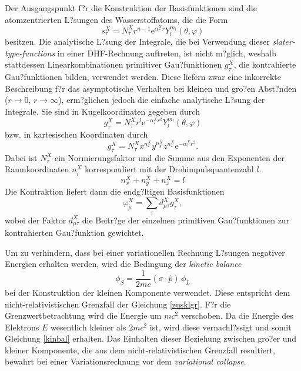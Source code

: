Der Ausgangspunkt f?r die Konstruktion der Basisfunktionen sind die atomzentrierten L?sungen des Wasserstoffatoms, die die Form
\begin{equation}
s_\tau^X = N_\tau^X r^{n-1}\mathrm{e}^{\alpha_\tau^X r}Y_l^{m_l}(\theta,\varphi)
\end{equation}
besitzen. Die analytische L?sung der Integrale, die bei Verwendung dieser \emph{slater-type-functions} in einer DHF-Rechnung auftreten, ist nicht m?glich, weshalb stattdessen Linearkombinationen primitiver Gau?funktionen $g_\tau^X$, die kontrahierte Gau?funktionen bilden, verwendet werden. Diese liefern zwar eine inkorrekte Beschreibung f?r das asymptotische Verhalten bei kleinen und gro?en Abst?nden ($r\rightarrow 0$, $r\rightarrow\infty$), erm?glichen jedoch die einfache analytische L?sung der Integrale. Sie sind in Kugelkoordinaten gegeben durch
\begin{equation}
g_\tau^X = N_\tau^Xr^l\mathrm{e}^{-\alpha_\tau^Xr^2}Y_l^{m_l}(\theta,\varphi)
\end{equation}
bzw. in kartesischen Koordinaten durch
\begin{equation}
g_\tau^X = N_\tau^X x^{n_x^X}y^{n_y^X}z^{n_z^X} \mathrm{e}^{-\alpha_\tau^Xr^2}.
\end{equation}
Dabei ist $N_\tau^X$ ein Normierungsfaktor und die Summe aus den Exponenten der Raumkoordinaten $n_i^X$ korrespondiert mit der Drehimpulsquantenzahl $l$.
\begin{equation}
n_x^X+n_y^X+n_z^X=l
\end{equation}
Die Kontraktion liefert dann die endg?ltigen Basisfunktionen
\begin{equation}
\varphi^X_\mu = \sum\limits_\tau d_{\mu\tau}^Xg_\tau^X,
\end{equation}
wobei der Faktor $d_{\mu\tau}^X$ die Beitr?ge der einzelnen primitiven Gau?funktionen zur kontrahierten Gau?funktion gewichtet.

Um zu verhindern, dass bei einer variationellen Rechnung L?sungen negativer Energien erhalten werden, wird die Bedingung der \emph{kinetic balance}
\begin{equation}\label{kinbal}
\phi_S = \frac1{2mc}(\sigma\cdot\hat{p})\,\phi_L
\end{equation}
 bei der Konstruktion der kleinen Komponente verwendet. Diese entspricht dem nicht-relativistischen Grenzfall der Gleichung \ref{zusklgr}. F?r die Grenzwertbetrachtung wird die Energie um $mc^2$ verschoben. Da die Energie des Elektrons $E$ wesentlich kleiner als $2mc^2$ ist, wird diese vernachl?ssigt und somit Gleichung \ref{kinbal} erhalten.
Das Einhalten dieser Beziehung zwischen gro?er und kleiner Komponente, die aus dem nicht-relativistischen Grenzfall resultiert, bewahrt bei einer Variationsrechnung vor dem \emph{variational collapse}.

